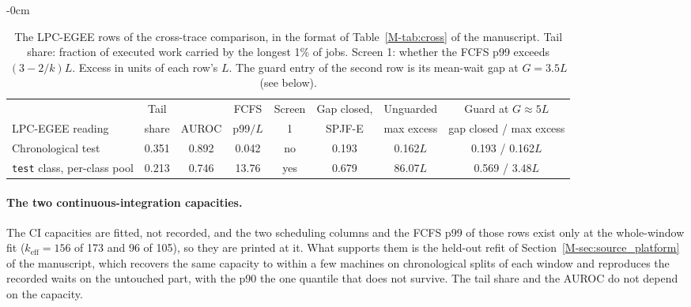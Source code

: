 \documentclass[mathematics,supfile,submit,moreauthors]{Definitions/mdpi}
\newcommand{\devnum}[1]{#1}
\begin{document}
\begin{table}[H]
\begin{adjustwidth}{-\extralength}{0cm}
\centering
\caption{The LPC-EGEE rows of the cross-trace comparison, in the format of
Table~\ref*{M-tab:cross} of the manuscript. Tail share: fraction of executed work carried
by the longest \devnum{1\%} of jobs. Screen 1: whether the FCFS p99 exceeds $(3-2/k)L$.
Excess in units of each row's $L$. The guard entry of the second row is its mean-wait gap
at $G = \devnum{3.5}L$ (see below).}
\label{tab:s_lpc_rows}
\small
\setlength{\tabcolsep}{3pt}
\begin{tabular}{lccccccc}
\toprule
 & Tail & & FCFS & Screen & Gap closed, & Unguarded & Guard at $G \approx \devnum{5}L$ \\
LPC-EGEE reading & share & AUROC & p99$/L$ & 1 & SPJF-E & max excess & gap closed / max excess \\
\midrule
Chronological test & \devnum{0.351} & \devnum{0.892} & \devnum{0.042} & no & \devnum{0.193} & \devnum{0.162}$L$ & \devnum{0.193} / \devnum{0.162}$L$ \\
\texttt{test} class, per-class pool & \devnum{0.213} & \devnum{0.746} & \devnum{13.76} & yes & \devnum{0.679} & \devnum{86.07}$L$ & \devnum{0.569} / \devnum{3.48}$L$ \\
\bottomrule
\end{tabular}
\end{adjustwidth}
\end{table}

\paragraph{The two continuous-integration capacities.}
The CI capacities are fitted, not recorded, and the two scheduling columns and the FCFS
p99 of those rows exist only at the whole-window fit ($k_{\mathrm{eff}} = \devnum{156}$
of \devnum{173} and \devnum{96} of \devnum{105}), so they are printed at it. What
supports them is the held-out refit of Section~\ref*{M-sec:source_platform} of the manuscript, which recovers the
same capacity to within a few machines on chronological splits of each window and
reproduces the recorded waits on the untouched part, with the p90 the one quantile that
does not survive. The tail share and the AUROC do not depend on the capacity.
\end{document}

